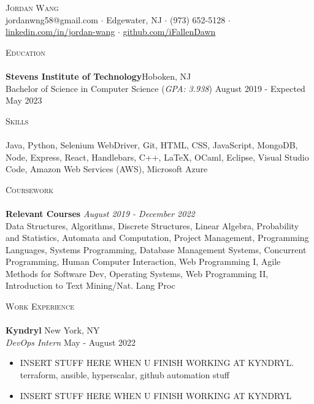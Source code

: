 \documentclass[10pt]{article}
\newcommand{\lineunder} {
    \vspace*{-8pt} \\
    \hspace*{-18pt} \hrulefill \\
}
\newcommand{\header} [1] {
    {\hspace*{-18pt}\vspace*{6pt} \textsc{#1}}
    \vspace*{-6pt} \lineunder
}
\begin{document}
\vspace*{-40pt}

    

\vspace*{2pt}
\begin{center}
	{\Huge \scshape {Jordan Wang}}\\
	\vspace{2mm}
	jordanwng58@gmail.com $\cdot$ Edgewater, NJ $\cdot$ (973) 652-5128 $\cdot$ \href{https://www.linkedin.com/in/jordan-wang/}{linkedin.com/in/jordan-wang} $\cdot$ \href{https://github.com/iFallenDawn}{github.com/iFallenDawn} \\
\end{center}
\header{Education}
\textbf{Stevens Institute of Technology}\hfill Hoboken, NJ\\
Bachelor of Science in Computer Science (\textit{GPA: 3.938}) \hfill August 2019 - Expected May 2023\\
\vspace{2mm}

\header{Skills}
	Java, Python, Selenium WebDriver, Git, HTML, CSS, JavaScript, MongoDB, Node, Express, React, Handlebars, C++, \LaTeX, OCaml, Eclipse, Visual Studio Code, Amazon Web Services (AWS), Microsoft Azure                    \\
\vspace{2mm}

\header{Coursework}
{\textbf{Relevant Courses}} {\sl August 2019 - December 2022} \hfill 
\\
Data Structures, Algorithms, Discrete Structures, Linear Algebra, Probability and Statistics, Automata and Computation, Project Management, Programming Languages, Systems Programming, Database Management Systems, Concurrent Programming, Human Computer Interaction, Web Programming I, Agile Methods for Software Dev, Operating Systems, Web Programming II, Introduction to Text Mining/Nat. Lang Proc\\
\vspace{2mm}

\header{Work Experience}
\textbf{Kyndryl} \hfill New York, NY\\
\textit{DevOps Intern} \hfill May - August 2022\\
\vspace{-1mm}
\begin{itemize}[noitemsep,parsep=0pt,partopsep=0pt]\itemsep 1pt
    \item INSERT STUFF HERE WHEN U FINISH WORKING AT KYNDRYL. terraform, ansible, hyperscalar, github automation stuff
    \item INSERT STUFF HERE WHEN U FINISH WORKING AT KYNDRYL
\end{itemize}
\end{document}
